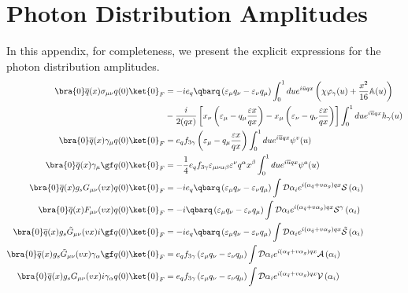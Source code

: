 \section{Photon Distribution Amplitudes}
\label{appndxa}
In this appendix, for completeness, we present the explicit expressions for the photon distribution amplitudes\cite{PhotonDA}.
\begin{align*}
        \bra{0}\overline{q}(x)\sigma_{\mu\nu}q(0)\ket{0}_F &= -ie_q\qbarq\left(\varepsilon_\mu q_\nu - \varepsilon_\nu q_\mu\right) \int_0^1 du e^{i\bar{u}qx}\left(\chi\varphi_\gamma(u)+\dfrac{x^2}{16}\mathbb{A}(u)\right) \nonumber \\
        &-\dfrac{i}{2(qx)}\left[x_\nu\left(\varepsilon_\mu - q_\mu\dfrac{\varepsilon x}{qx}\right) - x_\mu\left(\varepsilon_\nu - q_\nu\dfrac{\varepsilon x}{q x}\right)\right] \int_0^1 du e^{i\overline{u}qx}h_\gamma(u) \nonumber \\    
        \bra{0}\overline{q}(x)\gamma_\mu q(0)\ket{0}_F &= e_qf_{3\gamma}\left(\varepsilon_\mu-q_\mu\dfrac{\varepsilon x}{qx}\right) \int_0^1du e^{i\overline{u}qx}\psi^v(u)\\    
        \bra{0}\overline{q}(x)\gamma_\mu\gf q(0)\ket{0}_F &=-\dfrac{1}{4}e_qf_{3\gamma}\varepsilon_{\mu\nu\alpha\beta}\varepsilon^\nu q^\alpha x^\beta \int_0^1 du e^{i\overline{u}qx}\psi^a(u)\\   
        \bra{0}\overline{q}(x)g_sG_{\mu\nu}(vx)q(0)\ket{0}_F&=-ie_q\qbarq\left(\varepsilon_\mu q_\nu - \varepsilon_\nu q_\mu\right)\int \mathcal{D}\alpha_ie^{i(\alpha_{\Bar{q}}+v\alpha_g)qx}\mathcal{S}\left(\alpha_i\right)\\
        \bra{0}\overline{q}(x)F_{\mu\nu}(vx)q(0)\ket{0}_F&=-i\qbarq\left(\varepsilon_\mu q_\nu - \varepsilon_\nu q_\mu\right)\int \mathcal{D}\alpha_ie^{i(\alpha_{\Bar{q}}+v\alpha_g)qx}\mathcal{S}^\gamma\left(\alpha_i\right)\\ 
        \bra{0}\overline{q}(x)g_s\Tilde{G}_{\mu\nu}(vx)i\gf q(0)\ket{0}_F&=-ie_q\qbarq\left(\varepsilon_\mu q_\nu - \varepsilon_\nu q_\mu\right)\int \mathcal{D}\alpha_ie^{i(\alpha_{\Bar{q}}+v\alpha_g)qx}\Tilde{\mathcal{S}}\left(\alpha_i\right)\\   
        \bra{0}\overline{q}(x)g_s\Tilde{G}_{\mu\nu}(vx)\gamma_\alpha\gf q(0)\ket{0}_F&=e_qf_{3\gamma}\left(\varepsilon_\mu q_\nu - \varepsilon_\nu q_\mu\right)\int \mathcal{D}\alpha_ie^{i(\alpha_{\Bar{q}}+v\alpha_g)qx}\mathcal{A}\left(\alpha_i\right)\\   
        \bra{0}\overline{q}(x)g_sG_{\mu\nu}(vx)i\gamma_\alpha q(0)\ket{0}_F &=e_qf_{3\gamma}\left(\varepsilon_\mu q_\nu - \varepsilon_\nu q_\mu\right)\int \mathcal{D}\alpha_ie^{i(\alpha_{\Bar{q}}+v\alpha_g)qx}\mathcal{V}\left(\alpha_i\right)\\   

\end{align*}
